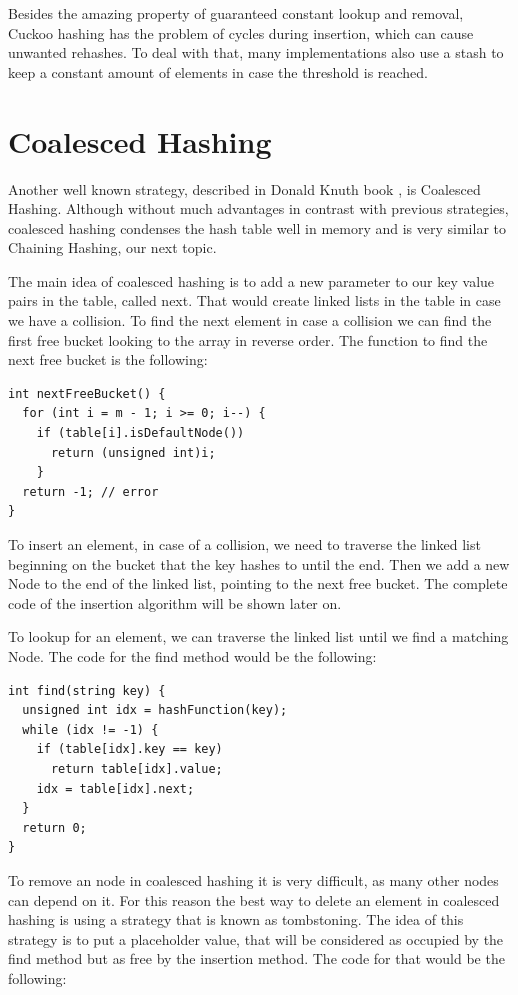 Besides the amazing property of guaranteed constant lookup and removal, Cuckoo hashing has the problem of cycles during insertion, which can cause unwanted rehashes. To deal with that, many implementations also use a stash to keep a constant amount of elements in case the threshold is reached.

\section{Coalesced Hashing}

Another well known strategy, described in Donald Knuth book \citep{TAOCP3}, is Coalesced Hashing. Although without much advantages in contrast with previous strategies, coalesced hashing condenses the hash table well in memory and is very similar to Chaining Hashing, our next topic.

The main idea of coalesced hashing is to add a new parameter to our key value pairs in the table, called next. That would create linked lists in the table in case we have a collision. To find the next element in case a collision we can find the first free bucket looking to the array in reverse order. The function to find the next free bucket is the following:

\begin{lstlisting}
int nextFreeBucket() {
  for (int i = m - 1; i >= 0; i--) {
    if (table[i].isDefaultNode())
      return (unsigned int)i;
    }
  return -1; // error
}
\end{lstlisting}

To insert an element, in case of a collision, we need to traverse the linked list beginning on the bucket that the key hashes to until the end. Then we add a new Node to the end of the linked list, pointing to the next free bucket. The complete code of the insertion algorithm will be shown later on.

To lookup for an element, we can traverse the linked list until we find a matching Node. The code for the find method would be the following:

\begin{lstlisting}
int find(string key) {
  unsigned int idx = hashFunction(key);
  while (idx != -1) {
    if (table[idx].key == key) 
      return table[idx].value;
    idx = table[idx].next;         
  }    
  return 0;
}
\end{lstlisting}

To remove an node in coalesced hashing it is very difficult, as many other nodes can depend on it. For this reason the best way to delete an element in coalesced hashing is using a strategy that is known as tombstoning. The idea of this strategy is to put a placeholder value, that will be considered as occupied by the find method but as free by the insertion method. The code for that would be the following:

